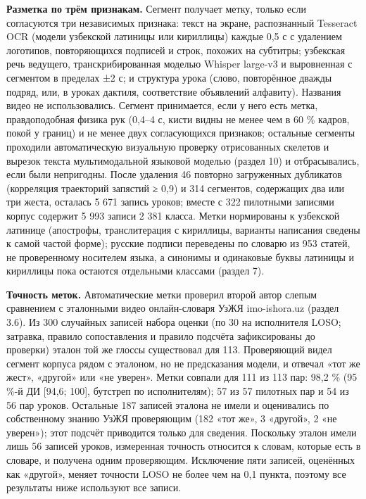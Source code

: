 \textbf{Разметка по трём признакам.} Сегмент получает метку, только если согласуются три независимых признака: текст на экране, распознанный Tesseract OCR \citep{2007_smith_tesseract} (модели узбекской латиницы или кириллицы) каждые 0,5 с с удалением логотипов, повторяющихся подписей и строк, похожих на субтитры; узбекская речь ведущего, транскрибированная моделью Whisper large-v3 \citep{2023_radford_whisper} и выровненная с сегментом в пределах ±2 с; и структура урока (слово, повторённое дважды подряд, или, в уроках дактиля, соответствие объявлений алфавиту). Названия видео не использовались. Сегмент принимается, если у него есть метка, правдоподобная физика рук (0,4--4 с, кисти видны не менее чем в 60 \% кадров, покой у границ) и не менее двух согласующихся признаков; остальные сегменты проходили автоматическую визуальную проверку отрисованных скелетов и вырезок текста мультимодальной языковой моделью (раздел 10) и отбрасывались, если были непригодны. После удаления 46 повторно загруженных дубликатов (корреляция траекторий запястий ≥ 0,9) и 314 сегментов, содержащих два или три жеста, осталась 5 671 запись уроков; вместе с 322 пилотными записями корпус содержит 5 993 записи 2 381 класса. Метки нормированы к узбекской латинице (апострофы, транслитерация с кириллицы, варианты написания сведены к самой частой форме); русские подписи переведены по словарю из 953 статей, не проверенному носителем языка, а синонимы и одинаковые буквы латиницы и кириллицы пока остаются отдельными классами (раздел 7).

\textbf{Точность меток.} Автоматические метки проверил второй автор слепым сравнением с эталонными видео онлайн-словаря УзЖЯ imo-ishora.uz (раздел 3.6). Из 300 случайных записей набора оценки (по 30 на исполнителя LOSO; затравка, правило сопоставления и правило подсчёта зафиксированы до проверки) эталон той же глоссы существовал для 113. Проверяющий видел сегмент корпуса рядом с эталоном, но не предсказания модели, и отвечал «тот же жест», «другой» или «не уверен». Метки совпали для 111 из 113 пар: 98,2 \% (95 \%-й ДИ {[}94,6; 100{]}, бутстреп по исполнителям); 57 из 57 пилотных пар и 54 из 56 пар уроков. Остальные 187 записей эталона не имели и оценивались по собственному знанию УзЖЯ проверяющим (182 «тот же», 3 «другой», 2 «не уверен»); этот подсчёт приводится только для сведения. Поскольку эталон имели лишь 56 записей уроков, измеренная точность относится к словам, которые есть в словаре, и получена одним проверяющим. Исключение пяти записей, оценённых как «другой», меняет точности LOSO не более чем на 0,1 пункта, поэтому все результаты ниже используют все записи.

